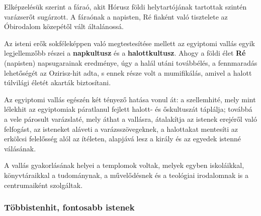 Elképzelésük szerint a fáraó, akit Hórusz földi helytartójának tartottak szintén varázserőt sugárzott. A fáraónak a napisten, Ré fiaként való tisztelete az Óbirodalom közepétől vált általánossá.

Az isteni erők sokféleképpen való megtestesítése mellett az egyiptomi vallás egyik legjellemzőbb részei a \textbf{napkultusz} és a \textbf{halottkultusz}. Ahogy a földi élet \textbf{Ré} (napisten) napsugarainak eredménye, úgy a halál utáni továbbélés, a fennmaradás lehetőségét az Ozirisz-hit adta, s ennek része volt a mumifikálás, amivel a halott túlvilági életét akarták biztosítani.

Az egyiptomi vallás egészén két tényező hatása vonul át: a szellemhité, mely mint lélekhit az egyiptomiak páratlanul fejlett halott- és őskultuszát táplálja; továbbá a vele párosult varázslaté, mely áthat a vallásra, átalakítja az istenek erejéről való felfogást, az isteneket aláveti a varázsszövegeknek, a halottakat mentesíti az erkölcsi felelősség alól az ítéleten, alapjává lesz a király és az egyedek istenné válásának.

A vallás gyakorlásának helyei a templomok voltak, melyek egyben iskoláikkal, könyvtáraikkal a tudománynak, a művelődésnek és a teológiai irodalomnak is a centrumaiként szolgáltak.

\subsubsection*{Többistenhit, fontosabb istenek}

